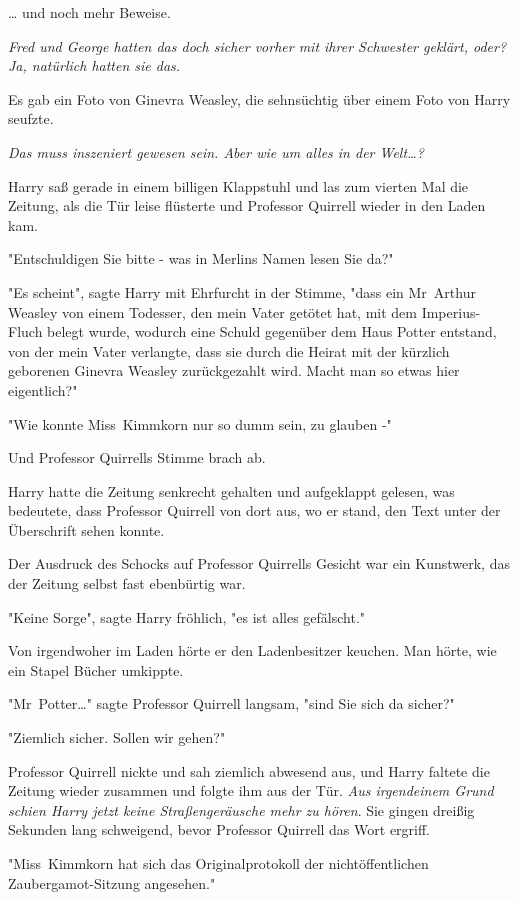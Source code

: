 {… und noch mehr Beweise.

\emph{Fred und George hatten das doch sicher vorher mit ihrer Schwester geklärt, oder? Ja, natürlich hatten sie das.}

Es gab ein Foto von Ginevra Weasley, die sehnsüchtig über einem Foto von Harry seufzte.

\emph{Das muss inszeniert gewesen sein. Aber wie um alles in der Welt…?}

Harry saß gerade in einem billigen Klappstuhl und las zum vierten Mal die Zeitung, als die Tür leise flüsterte und Professor Quirrell wieder in den Laden kam.

"Entschuldigen Sie bitte - was in Merlins Namen lesen Sie da?"

"Es scheint", sagte Harry mit Ehrfurcht in der Stimme, "dass ein Mr~Arthur Weasley von einem Todesser, den mein Vater getötet hat, mit dem Imperius-Fluch belegt wurde, wodurch eine Schuld gegenüber dem Haus Potter entstand, von der mein Vater verlangte, dass sie durch die Heirat mit der kürzlich geborenen Ginevra Weasley zurückgezahlt wird. Macht man so etwas hier eigentlich?"

"Wie konnte Miss~Kimmkorn nur so dumm sein, zu glauben -"

Und Professor Quirrells Stimme brach ab.

Harry hatte die Zeitung senkrecht gehalten und aufgeklappt gelesen, was bedeutete, dass Professor Quirrell von dort aus, wo er stand, den Text unter der Überschrift sehen konnte.

Der Ausdruck des Schocks auf Professor Quirrells Gesicht war ein Kunstwerk, das der Zeitung selbst fast ebenbürtig war.

"Keine Sorge", sagte Harry fröhlich, "es ist alles gefälscht."

Von irgendwoher im Laden hörte er den Ladenbesitzer keuchen. Man hörte, wie ein Stapel Bücher umkippte.

"Mr~Potter…" sagte Professor Quirrell langsam, "sind Sie sich da sicher?"

"Ziemlich sicher. Sollen wir gehen?"

Professor Quirrell nickte und sah ziemlich abwesend aus, und Harry faltete die Zeitung wieder zusammen und folgte ihm aus der Tür. \emph{Aus irgendeinem Grund schien Harry jetzt keine Straßengeräusche mehr zu hören}. Sie gingen dreißig Sekunden lang schweigend, bevor Professor Quirrell das Wort ergriff.

"Miss~Kimmkorn hat sich das Originalprotokoll der nichtöffentlichen Zaubergamot-Sitzung angesehen."

}
